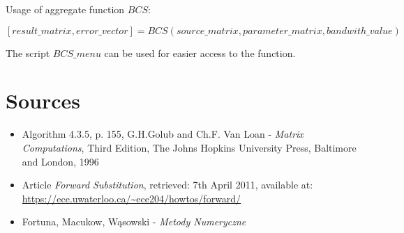 \documentclass{article}
\begin{document}
Usage of aggregate function $BCS$:

\[ [result\_matrix, error\_vector] = BCS(source\_matrix, parameter\_matrix,
bandwith\_value) \]

The script $BCS\_menu$ can be used for easier access to the function.

\section{Sources}

\begin{itemize}
	\item Algorithm 4.3.5, p. 155, G.H.Golub and Ch.F. Van Loan -
	\emph{Matrix Computations}, Third Edition, The Johns Hopkins University Press,
	Baltimore and London, 1996
	\item Article \emph{Forward Substitution}, retrieved: 7th
	April 2011, available at:
	\url{https://ece.uwaterloo.ca/~ece204/howtos/forward/} 
	\item Fortuna, Macukow, Wąsowski - \emph{Metody Numeryczne}
\end{itemize}
 
\end{document}
